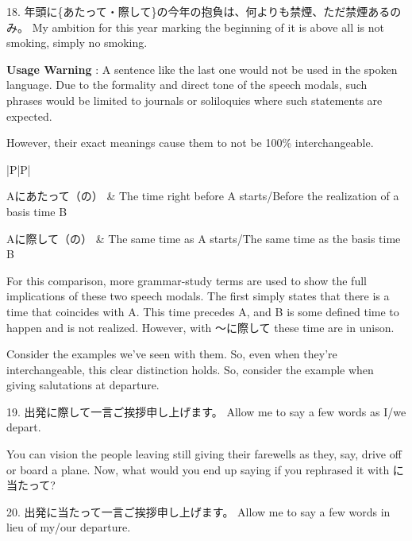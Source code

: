 \par{18. 年頭に\{あたって・際して\}の今年の抱負は、何よりも禁煙、ただ禁煙あるのみ。 \hfill\break
My ambition for this year marking the beginning of it is above all is not smoking, simply no smoking. }

\par{\textbf{Usage Warning }: A sentence like the last one would not be used in the spoken language. Due to the formality and direct tone of the speech modals, such phrases would be limited to journals or soliloquies where such statements are expected. }

\par{However, their exact meanings cause them to not be 100\% interchangeable. }

\begin{ltabulary}{|P|P|}
\hline 

Aにあたって（の） & The time right before A starts\slash Before the realization of a basis time B \\ 

Aに際して（の） & The same time as A starts\slash The same time as the basis time B \\ 

\end{ltabulary}

\par{ For this comparison, more grammar-study terms are used to show the full implications of these two speech modals. The first simply states that there is a time that coincides with A. This time precedes A, and B is some defined time to happen and is not realized. However, with ～に際して these time are in unison. }

\par{ Consider the examples we've seen with them. So, even when they're interchangeable, this clear distinction holds. So, consider the example when giving salutations at departure. }

\par{19. 出発に際して一言ご挨拶申し上げます。 \hfill\break
Allow me to say a few words as I\slash we depart. }

\par{ You can vision the people leaving still giving their farewells as they, say, drive off or board a plane. Now, what would you end up saying if you rephrased it with に当たって? }

\par{20. 出発に当たって一言ご挨拶申し上げます。 \hfill\break
Allow me to say a few words in lieu of my\slash our departure. }

